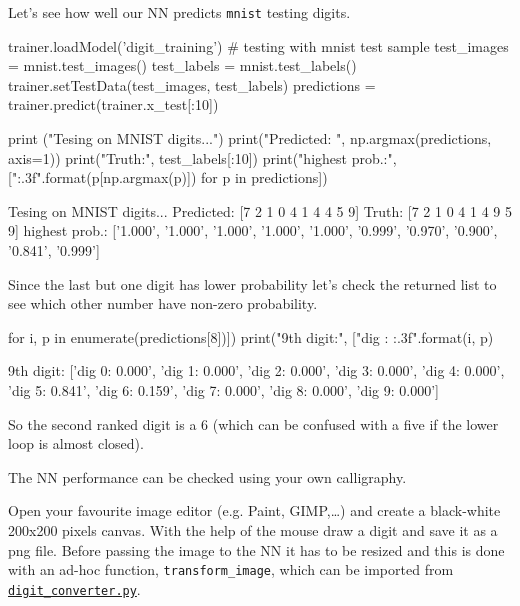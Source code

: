Let's see how well our NN predicts \texttt{mnist} testing digits.

\begin{ipython}
trainer.loadModel('digit_training')
# testing with mnist test sample
test_images = mnist.test_images()
test_labels = mnist.test_labels()
trainer.setTestData(test_images, test_labels)
predictions = trainer.predict(trainer.x_test[:10])

print ("Tesing on MNIST digits...")
print("Predicted: ", np.argmax(predictions, axis=1))
print("Truth:", test_labels[:10])
print("highest prob.:", ["{:.3f}".format(p[np.argmax(p)]) for p in predictions])
\end{ipython}
\begin{ioutput}
Tesing on MNIST digits...
Predicted:  [7 2 1 0 4 1 4 4 5 9]
Truth: [7 2 1 0 4 1 4 9 5 9]
highest prob.: ['1.000', '1.000', '1.000', '1.000', '1.000', '0.999', 
'0.970', '0.900', '0.841', '0.999']
\end{ioutput}

Since the last but one digit has lower probability let's check the returned list to see which other number have non-zero probability.

\begin{ipython}
for i, p in enumerate(predictions[8])])
    print("9th digit:", ["dig {}: {:.3f}".format(i, p)
\end{ipython}
\begin{ioutput}
9th digit: ['dig 0: 0.000', 'dig 1: 0.000', 'dig 2: 0.000', 'dig 3: 0.000', 
'dig 4: 0.000', 'dig 5: 0.841', 'dig 6: 0.159', 'dig 7: 0.000', 
'dig 8: 0.000', 'dig 9: 0.000']
\end{ioutput}

So the second ranked digit is a 6 (which can be confused with a five if the lower loop is almost closed).

The NN performance can be checked using your own calligraphy. 

Open your favourite image editor (e.g. Paint, GIMP,\ldots) and create a black-white 200x200 pixels canvas. With the help of the mouse draw a digit and save it as a png file.
Before passing the image to the NN it has to be resized and this is done with an ad-hoc function, \texttt{transform\_image}, which can be imported from \href{https://raw.githubusercontent.com/matteosan1/finance_course/develop/libro/input_files/digit_converter.py}{\texttt{digit\_converter.py}}.

